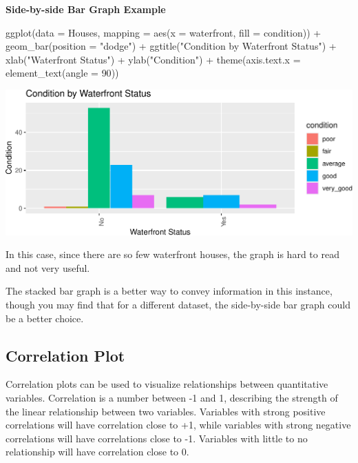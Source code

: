 \documentclass[
  letterpaper,
  DIV=11,
  numbers=noendperiod]{scrreprt}
\newenvironment{Shaded}{\begin{snugshade}}{\end{snugshade}}
\newcommand{\AttributeTok}[1]{\textcolor[rgb]{0.40,0.45,0.13}{#1}}
\newcommand{\DecValTok}[1]{\textcolor[rgb]{0.68,0.00,0.00}{#1}}
\newcommand{\FunctionTok}[1]{\textcolor[rgb]{0.28,0.35,0.67}{#1}}
\newcommand{\NormalTok}[1]{\textcolor[rgb]{0.00,0.23,0.31}{#1}}
\newcommand{\SpecialCharTok}[1]{\textcolor[rgb]{0.37,0.37,0.37}{#1}}
\newcommand{\StringTok}[1]{\textcolor[rgb]{0.13,0.47,0.30}{#1}}
\begin{document}
\textbf{Side-by-side Bar Graph Example}

\begin{Shaded}
\begin{Highlighting}[]
\FunctionTok{ggplot}\NormalTok{(}\AttributeTok{data =}\NormalTok{ Houses, }\AttributeTok{mapping =} \FunctionTok{aes}\NormalTok{(}\AttributeTok{x =}\NormalTok{ waterfront, }\AttributeTok{fill =}\NormalTok{ condition)) }\SpecialCharTok{+}
    \FunctionTok{geom\_bar}\NormalTok{(}\AttributeTok{position =} \StringTok{"dodge"}\NormalTok{) }\SpecialCharTok{+}
  \FunctionTok{ggtitle}\NormalTok{(}\StringTok{"Condition by Waterfront Status"}\NormalTok{) }\SpecialCharTok{+} 
  \FunctionTok{xlab}\NormalTok{(}\StringTok{"Waterfront Status"}\NormalTok{) }\SpecialCharTok{+} 
  \FunctionTok{ylab}\NormalTok{(}\StringTok{"Condition"}\NormalTok{) }\SpecialCharTok{+}   
  \FunctionTok{theme}\NormalTok{(}\AttributeTok{axis.text.x =} \FunctionTok{element\_text}\NormalTok{(}\AttributeTok{angle =} \DecValTok{90}\NormalTok{)) }
\end{Highlighting}
\end{Shaded}

\includegraphics{Ch1_files/figure-pdf/unnamed-chunk-30-1.pdf}

In this case, since there are so few waterfront houses, the graph is
hard to read and not very useful.

The stacked bar graph is a better way to convey information in this
instance, though you may find that for a different dataset, the
side-by-side bar graph could be a better choice.

\subsection{Correlation Plot}\label{correlation-plot}

Correlation plots can be used to visualize relationships between
quantitative variables. Correlation is a number between -1 and 1,
describing the strength of the linear relationship between two
variables. Variables with strong positive correlations will have
correlation close to +1, while variables with strong negative
correlations will have correlations close to -1. Variables with little
to no relationship will have correlation close to 0.
\end{document}
